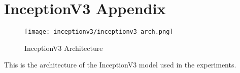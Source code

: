 \section{InceptionV3 Appendix}\label{s:inceptionv3_appendix}

\begin{figure}[H]
  \begin{center}
    \texttt{[image: inceptionv3/inceptionv3\_arch.png]}
  \end{center}
  \caption{InceptionV3 Architecture}\label{f:inceptionv3_arch}
\end{figure}

This is the architecture of the InceptionV3 model used in the experiments.
